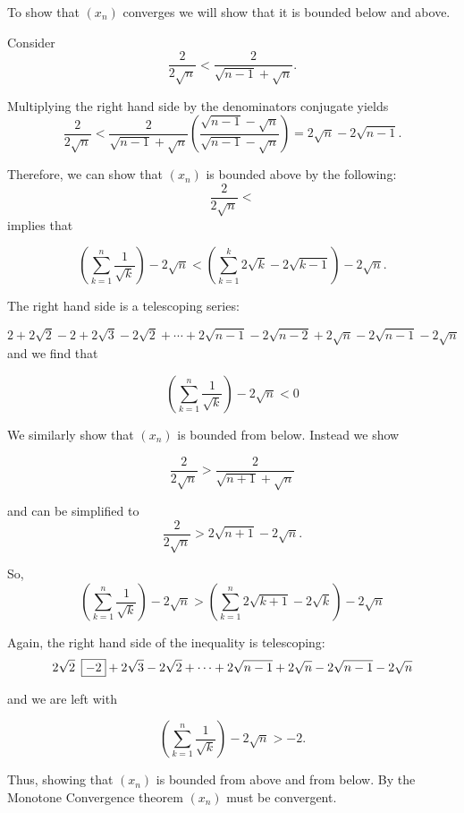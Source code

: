 \documentclass{report}
\begin{document}
\begin{myproof}
    To show that $(x_n)$ converges we will show that it is bounded below and above. 

    Consider $$\frac{2}{2 \sqrt{n}} < \frac{2}{\sqrt{n-1} + \sqrt{n}}.$$

Multiplying the right hand side by the denominators conjugate yields
 $$\frac{2}{2 \sqrt{n}} < \frac{2}{\sqrt{n-1} + \sqrt{n}} \left(\frac{\sqrt{n-1} - \sqrt{n}}{\sqrt{n-1} - \sqrt{n}}  \right) = 2\sqrt{n} - 2\sqrt{n-1}.$$

 Therefore, we can show that $(x_n)$ is bounded above by the following:
 $$\frac{2}{2 \sqrt{n}} < $$ implies  that 

 $$
\left(\sum_{k=1}^{n} \frac{1}{\sqrt{k}} \right)-2 \sqrt{n} < \left( \sum_{k=1}^{k} 2\sqrt{k} - 2\sqrt{k-1}\right) - 2\sqrt{n}.$$

 The right hand side is a telescoping series:

 $$
 2 + 2\sqrt{2} - 2 + 2\sqrt{3}- 2\sqrt{2} + \cdots +2\sqrt{n-1}  - 2\sqrt{n-2} + 2\sqrt{n} - 2 \sqrt{n-1} - 2\sqrt{n}
$$
and we find that

 $$
\left(\sum_{k=1}^{n} \frac{1}{\sqrt{k}} \right)-2 \sqrt{n} < 0 $$

We similarly show that $(x_n)$ is bounded from below. Instead we show

$$\frac{2}{2 \sqrt{n}} > \frac{2}{\sqrt{n+1} + \sqrt{n}}$$

and can be simplified to
 $$\frac{2}{2 \sqrt{n}} > 2\sqrt{n+1} - 2\sqrt{n}.$$
 

 So,
 $$
\left(\sum_{k=1}^{n} \frac{1}{\sqrt{k}} \right)-2 \sqrt{n} > \left( \sum_{k=1}^{n} 2\sqrt{k+1} - 2\sqrt{k} \right) - 2\sqrt{n}
 $$

Again, the right hand side of the inequality is telescoping:
 $$
 2\sqrt{2} \hspace{0.5em}\boxed{-2} + 2\sqrt{3}- 2\sqrt{2} + \cdots + 2\sqrt{n-1} + 2\sqrt{n} - 2 \sqrt{n-1} - 2\sqrt{n}
$$

 and we are left with 

$$\left(\sum_{k=1}^{n} \frac{1}{\sqrt{k}} \right)-2 \sqrt{n} > -2.$$

Thus, showing that $(x_n)$ is bounded from above and from below. By the Monotone Convergence theorem $(x_n)$ must be convergent.

\end{myproof}

\end{document}
